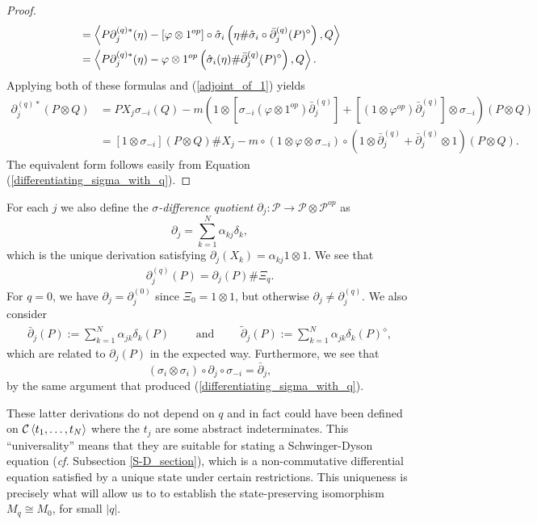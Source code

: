\begin{proof}
\begin{align*}
			&=\left\langle P\partial_j^{(q)*}(\eta) - [\varphi\otimes 1^{op}]\circ\hat{\sigma}_i\left( \eta\#\hat{\sigma}_i\circ \bar{\partial}_j^{(q)}(P)^\diamond\right), Q\right\rangle\\
			&=\left\langle P\partial_j^{(q)*}(\eta) - \varphi\otimes 1^{op}\left( \hat{\sigma}_i(\eta)\# \bar{\partial}_j^{(q)}(P)^\diamond\right), Q\right\rangle.
	\end{align*}
Applying both of these formulas and (\ref{adjoint_of_1}) yields
	\begin{align*}
		\partial_j^{(q)*}(P\otimes Q)&=PX_j\sigma_{-i}(Q) -m\left( 1\otimes\left[\sigma_{-i}(\varphi\otimes 1^{op})\bar{\partial}_j^{(q)}\right] + \left[(1\otimes \varphi^{op})\bar{\partial}_j^{(q)}\right]\otimes \sigma_{-i}\right)(P\otimes Q)\\
		&=[1\otimes\sigma_{-i}](P\otimes Q)\# X_j -m\circ\left( 1\otimes\varphi\otimes \sigma_{-i}\right)\circ\left(1\otimes\bar{\partial}_j^{(q)}+\bar{\partial}_j^{(q)}\otimes 1\right)(P\otimes Q).
	\end{align*}
The equivalent form follows easily from Equation (\ref{differentiating_sigma_with_q}).
\end{proof}

For each $j$ we also define the \textit{$\sigma$-difference quotient} $\partial_j\colon\mathscr{P}\rightarrow\mathscr{P}\otimes\mathscr{P}^{op}$ as
	\begin{equation*}
		\partial_j=\sum_{k=1}^N \alpha_{kj}\delta_k,
	\end{equation*}
which is the unique derivation satisfying $\partial_j(X_k)=\alpha_{kj}1\otimes 1$. We see that
	\begin{align*}
		\partial_j^{(q)}(P)=\partial_j(P)\# \Xi_q.
	\end{align*}
For $q=0$, we have $\partial_j=\partial_j^{(0)}$ since $\Xi_0=1\otimes 1$, but otherwise $\partial_j\neq \partial_j^{(q)}$. We also consider
	\begin{align*}
		\bar{\partial}_j(P):=\sum_{k=1}^N \alpha_{jk} \delta_k(P)\qquad\text{ and }\qquad \tilde{\partial}_j(P) :=\sum_{k=1}^N \alpha_{jk} \delta_k(P)^\diamond,
	\end{align*}
which are related to $\partial_j(P)$ in the expected way. Furthermore, we see that
	\begin{equation}\label{differentiating_sigma}
		(\sigma_i\otimes\sigma_i)\circ\partial_j\circ\sigma_{-i}=\bar{\partial}_j,
	\end{equation}
by the same argument that produced (\ref{differentiating_sigma_with_q}).\par
These latter derivations do not depend on $q$ and in fact could have been defined on $\mathcal C\left\langle t_1,\ldots, t_N\right\rangle$ where the $t_j$ are some abstract indeterminates. This ``universality'' means that they are suitable for stating a Schwinger-Dyson equation (\emph{cf.} Subsection \ref{S-D_section}), which is a non-commutative differential equation satisfied by a unique state under certain restrictions. This uniqueness is precisely what will allow us to to establish the state-preserving isomorphism $M_q\cong M_0$, for small $|q|$. 
	
